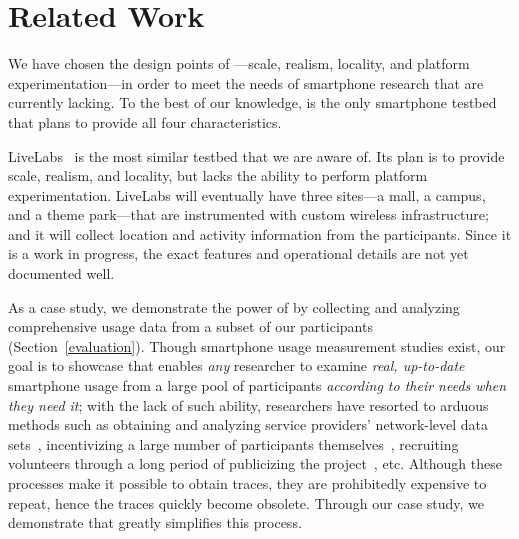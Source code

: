 \section{Related Work}
\label{sec:related}

We have chosen the design points of \PhoneLab{}---scale, realism, locality, and
platform experimentation---in order to meet the needs of smartphone research
that are currently lacking. To the best of our knowledge, \PhoneLab{} is the
only smartphone testbed that plans to provide all four characteristics.

LiveLabs~\cite{livelabs} is the most similar testbed that we are aware of. Its
plan is to provide scale, realism, and locality, but lacks the ability to
perform platform experimentation. LiveLabs will eventually have three sites---a
mall, a campus, and a theme park---that are instrumented with custom wireless
infrastructure; and it will collect location and activity information from the
participants. Since it is a work in progress, the exact features and operational
details are not yet documented well.

As a case study, we demonstrate the power of \PhoneLab{} by collecting and
analyzing comprehensive usage data from a subset of our participants
(Section~\ref{evaluation}). Though smartphone usage measurement studies exist,
our goal is to showcase that \PhoneLab{} enables {\it any} researcher to
examine {\it real, up-to-date} smartphone usage from a large pool of
participants {\it according to their needs when they need it}; with the lack of
such ability, researchers have resorted to arduous methods such as obtaining and
analyzing service providers' network-level data sets~\cite{xu:imc:2011,
trestian:imc:2009, trestian:ton:2012}, incentivizing a large number of
participants themselves~\cite{falaki:mobisys:2010}, recruiting volunteers
through a long period of publicizing the project~\cite{shye:micro:2009}, etc.
Although these processes make it possible to obtain traces, they are
prohibitedly expensive to repeat, hence the traces quickly become obsolete.
Through our case study, we demonstrate that \PhoneLab{} greatly simplifies this
process.

